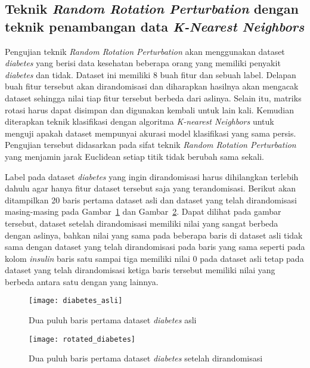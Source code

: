 \subsection{Teknik \textit{Random Rotation Perturbation} dengan teknik penambangan data \textit{K-Nearest Neighbors}}
\label{sec:rrp-knn}

Pengujian teknik \textit{Random Rotation Perturbation} akan menggunakan dataset \textit{diabetes} yang berisi data kesehatan beberapa orang yang memiliki penyakit \textit{diabetes} dan tidak. Dataset ini memiliki 8 buah fitur dan sebuah label. Delapan buah fitur tersebut akan dirandomisasi dan diharapkan hasilnya akan mengacak dataset sehingga nilai tiap fitur tersebut berbeda dari aslinya. Selain itu, matriks rotasi harus dapat disimpan dan digunakan kembali untuk lain kali. Kemudian diterapkan teknik klasifikasi dengan algoritma \textit{K-nearest Neighbors} untuk menguji apakah dataset mempunyai akurasi model klasifikasi yang sama persis. Pengujian tersebut didasarkan pada sifat teknik \textit{Random Rotation Perturbation} yang menjamin jarak Euclidean setiap titik tidak berubah sama sekali.

Label pada dataset \textit{diabetes} yang ingin dirandomisasi harus dihilangkan terlebih dahulu agar hanya fitur dataset tersebut saja yang terandomisasi. Berikut akan ditampilkan 20 baris pertama dataset asli dan dataset yang telah dirandomisasi masing-masing pada Gambar~\ref{fig:diabetes_asli} dan Gambar~\ref{fig:rotated_diabetes}. Dapat dilihat pada gambar tersebut, dataset setelah dirandomisasi memiliki nilai yang sangat berbeda dengan aslinya, bahkan nilai yang sama pada beberapa baris di dataset asli tidak sama dengan dataset yang telah dirandomisasi pada baris yang sama seperti pada kolom \textit{insulin} baris satu sampai tiga memiliki nilai 0 pada dataset asli tetap pada dataset yang telah dirandomisasi ketiga baris tersebut memiliki nilai yang berbeda antara satu dengan yang lainnya.

\begin{figure}
	\centering
	\texttt{[image: diabetes\_asli]}
	\caption{Dua puluh baris pertama dataset \textit{diabetes} asli}
	\label{fig:diabetes_asli}
\end{figure}

\begin{figure}
	\centering
	\texttt{[image: rotated\_diabetes]}
	\caption{Dua puluh baris pertama dataset \textit{diabetes} setelah dirandomisasi}
	\label{fig:rotated_diabetes}
\end{figure}


